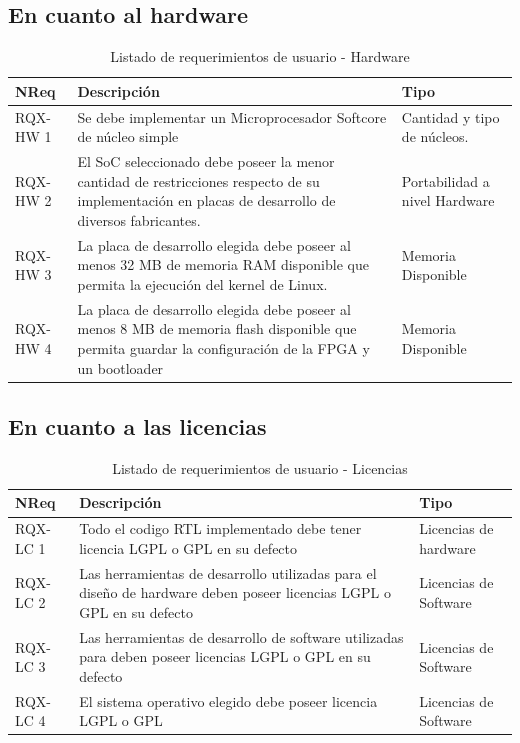		\subsection{En cuanto al hardware}
		\begin{table}[h]
		\centering
		\begin{tabular}{ p{2.5cm} p{8cm} p{3cm} }
		\hline 
		\rowcolor[gray]{0.8} N\textordmasculine Req & Descripción & Tipo\\
		\hline
		RQX-HW 1 &  Se debe implementar un Microprocesador Softcore de núcleo simple & Cantidad y tipo de núcleos. \\
		\hline
		RQX-HW 2 &  El SoC seleccionado debe poseer la menor cantidad de restricciones respecto de su implementación en placas de desarrollo de diversos
		fabricantes. & Portabilidad a nivel Hardware\\
		\hline
		RQX-HW 3 & La placa de desarrollo elegida debe poseer al menos 32 MB de memoria RAM disponible que permita la ejecución del kernel de Linux. &
		Memoria Disponible\\
		\hline
		RQX-HW 4 & La placa de desarrollo elegida debe poseer al menos 8 MB de memoria flash disponible que permita guardar la configuración de la FPGA y un
		bootloader & Memoria Disponible\\
		\hline
		\end{tabular}
		\caption{Listado de requerimientos de usuario - Hardware}
		\label{tab:requsr1}
		\end{table}
					
		\subsection{En cuanto a las licencias}
		\begin{table}[h]
		\centering
		\begin{tabular}{ p{2.5cm} p{8cm} p{3cm} }
		\hline 
		\rowcolor[gray]{0.8} N\textordmasculine Req & Descripción  & Tipo\\
		\hline 
		RQX-LC 1 &  Todo el codigo RTL implementado debe tener licencia LGPL o GPL en su defecto & Licencias de hardware\\
		\hline 
		RQX-LC 2 &  Las herramientas de desarrollo utilizadas para el diseño de hardware deben poseer licencias LGPL o GPL en su defecto & Licencias de Software\\
		\hline 
		RQX-LC 3 &  Las herramientas de desarrollo de software utilizadas para deben poseer licencias LGPL o GPL en su defecto & Licencias de Software\\
		\hline
		RQX-LC 4 & El sistema operativo elegido debe poseer licencia LGPL o GPL & Licencias de Software\\
		\hline
		\end{tabular}
		\caption{Listado de requerimientos de usuario - Licencias}
		\label{tab:requsr2}
		\end{table}
		
